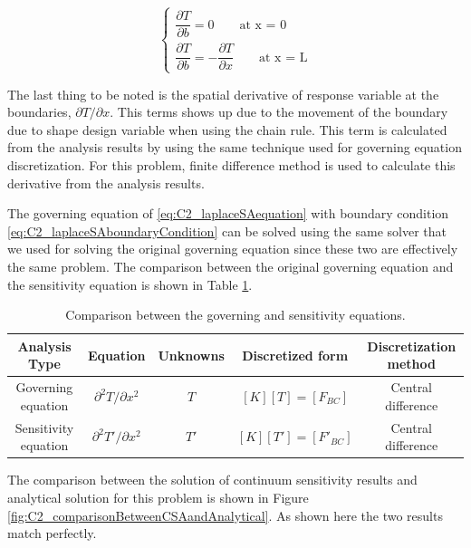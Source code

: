 \begin{equation}\label{eq:C2_laplaceSAboundaryCondition}
\begin{cases}
	\dfrac{\partial T}{\partial b} = 0 \qquad \text{at x = 0}
	\\
	\dfrac{\partial T}{\partial b} = -\dfrac{\partial T}{\partial x} \qquad \text{at x = L}
\end{cases}
\end{equation}

The last thing to be noted is the spatial derivative of response variable at the boundaries, $\partial T/\partial x$. This terms shows up due to the movement of the boundary due to shape design variable when using the chain rule. This term is calculated from the analysis results by using the same technique used for governing equation discretization. For this problem, finite difference method is used to calculate this derivative from the analysis results.

The governing equation of \eqref{eq:C2_laplaceSAequation} with boundary condition \eqref{eq:C2_laplaceSAboundaryCondition} can be solved using the same solver that we used for solving the original governing equation since these two are effectively the same problem. The comparison between the original governing equation and the sensitivity equation is shown in Table \ref{table:C2_comparisonBetweenGEandSA}.

\begin{center}
\begin{table}[h]
\begin{tabular}{c | c | c | c | c}
	Analysis Type & Equation & Unknowns & Discretized form & Discretization method \\ \hline \hline
	Governing equation & $\partial^2 T/\partial x^2$ & $T$ & $[K][T] = [F_{BC}]$ & Central difference \\ \hline
	Sensitivity equation & $\partial^2 T'/\partial x^2$ & $T'$ & $[K][T'] = [F'_{BC}]$ & Central difference
\end{tabular}
\caption{Comparison between the governing and sensitivity equations.}
\label{table:C2_comparisonBetweenGEandSA}
\end{table}
\end{center}

The comparison between the solution of continuum sensitivity results and analytical solution for this problem is shown in Figure \ref{fig:C2_comparisonBetweenCSAandAnalytical}. As shown here the two results match perfectly.

